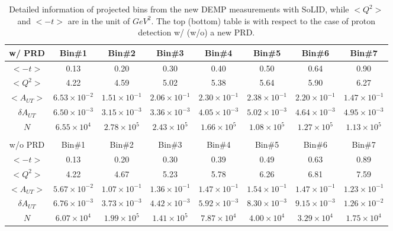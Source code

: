 	\begin{table}[!ht]
	\centering
	\begin{tabular}{|c|c|c|c|c|c|c|c|}
	   	\hline 
	w/ PRD   &  Bin\#1 & Bin\#2 & Bin\#3 & Bin\#4 & Bin\#5 & Bin\#6 & Bin\#7 \\
	 \hline
	  $<-t>$                &  0.13 & 0.20   & 0.30   & 0.40   & 0.50   & 0.64   & 0.90  \\
	   $<Q^{2}>$          & 4.22  & 4.59   & 5.02   & 5.38   & 5.64   & 5.90  & 6.27  \\
	   $<A_{UT}>$        &$6.53\times 10^{-2}$   & $1.51\times 10^{-1}$   & $2.06\times 10^{-1}$    & $2.30\times 10^{-1}$    & $2.38\times 10^{-1}$    & $2.20\times 10^{-1}$   & $1.47\times 10^{-1}$   \\
	   $\delta A_{UT}$  &  $6.50\times 10^{-3}$   & $3.15\times 10^{-3}$    &   $3.36\times 10^{-3}$  &  $4.05\times 10^{-3}$   &  $5.02\times 10^{-3}$   &   $4.64\times 10^{-3}$ &   $4.95\times 10^{-3}$ \\
	   $N$                     & $6.55\times 10^{4}$   &$2.78\times 10^{5}$   & $2.43\times 10^{5}$   &  $1.66\times 10^{5}$  & $1.08\times 10^{5}$  &  $1.27\times 10^{5}$ &$1.13\times 10^{5}$  \\
	 \hline
	 	\multicolumn{3}{c}{ } \\
	  \hline
	w/o PRD   &  Bin\#1 & Bin\#2 & Bin\#3 & Bin\#4 & Bin\#5 & Bin\#6 & Bin\#7 \\
	\hline 
	    $<-t>$                &  0.13 & 0.20   & 0.30   & 0.39   & 0.49   & 0.63   & 0.89  \\
	   $<Q^{2}>$          & 4.22  & 4.67   & 5.23   & 5.78   & 6.26   & 6.81  & 7.59  \\
	   $<A_{UT}>$        &$5.67\times 10^{-2}$   & $1.07\times 10^{-1}$   & $1.36\times 10^{-1}$    & $1.47\times 10^{-1}$    & $1.54\times 10^{-1}$    & $1.47\times 10^{-1}$   & $1.23\times 10^{-1}$   \\
	   $\delta A_{UT}$  &  $6.76\times 10^{-3}$   & $3.73\times 10^{-3}$    &   $4.42\times 10^{-3}$  &  $5.92\times 10^{-3}$   &  $8.30\times 10^{-3}$   &   $9.15\times 10^{-3}$ &   $1.26\times 10^{-2}$ \\
	   $N$                     & $6.07\times 10^{4}$   &$1.99\times 10^{5}$   & $1.41\times 10^{5}$   &  $7.87\times 10^{4}$  & $4.00\times 10^{4}$  &  $3.29\times 10^{4}$ &$1.75\times 10^{4}$  \\
	 \hline
	\end{tabular}
	\caption[Detailed information of projected bins]{\footnotesize{Detailed information of projected bins from the new DEMP measurements with SoLID, while $<Q^{2}>$ and $<-t>$ are in the unit of $GeV^{2}$. The top (bottom) table is with respect to the case of proton detection w/ (w/o) a new PRD.}}
	\label{asym_bin_table}
\end{table} 

